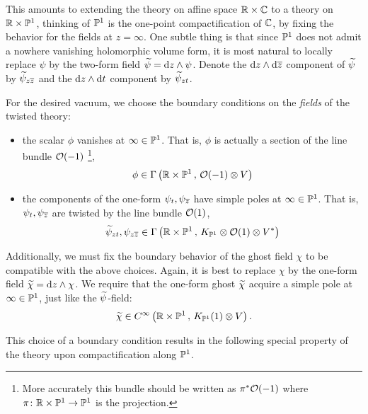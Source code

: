 \documentclass[11pt]{amsart}
\begin{document}
This amounts to extending the theory on affine space $\mathbb R \times \mathbb C$ to a theory on $\mathbb R \times \mathbb P^1$, thinking of $\mathbb P^1$ is the one-point compactification of $\mathbb C$, by fixing the behavior for the fields at $z = \infty$. 
One subtle thing is that since $\mathbb P^1$ does not admit a nowhere vanishing holomorphic volume form, it is most natural to locally replace $\psi$ by the two-form field $\widetilde \psi = {\rm d} z \wedge \psi$.
Denote the ${\rm d} z  \wedge {\rm d} {\overline{z}}$ component of $\widetilde \psi$ by $\widetilde \psi_{z {\overline{z}}}$ and the ${\rm d} z  \wedge {\rm d} t$ component by $\widetilde \psi_{zt}$. 

For the desired vacuum, we choose the boundary conditions on the \textit{fields} of the twisted theory:
\begin{itemize}
\item the scalar $\phi$ vanishes at $\infty \in \mathbb P^1$. 
That is, $\phi$ is actually a section of the line bundle $\mathcal O(-1)$ \footnote{More accurately this bundle should be written as $\pi^* \mathcal O(-1)$ where $\pi \colon \mathbb R \times \mathbb P^1 \to \mathbb P^1$ is the projection.}, 
\[
\phi \in \Gamma \left(\mathbb R \times \mathbb P^1 \, , \, \mathcal O(-1) \otimes V \right) 
\]
\item the components of the one-form $\psi_{t}, \psi_{{\overline{z}}}$ have simple poles at $\infty \in \mathbb P^1$.
That is, $\psi_t,\psi_{{\overline{z}}}$ are twisted by the line bundle $\mathcal O(1)$,
\[
\widetilde \psi_{zt}, \psi_{z{\overline{z}}}\in \Gamma\left(\mathbb R \times \mathbb P^1 \, , \, K_{\mathbb P^1} \otimes \mathcal O(1) \otimes V^*\right)
\]
\end{itemize}

Additionally, we must fix the boundary behavior of the ghost field $\chi$ to be compatible with the above choices.
Again, it is best to replace $\chi$ by the one-form field $\widetilde \chi = {\rm d} z \wedge \chi$. 
We require that the one-form ghost $\widetilde \chi$ acquire a simple pole at $\infty \in \mathbb P^1$, just like the $\widetilde \psi$-field:
\[
\widetilde\chi \in C^\infty\left(\mathbb R \times \mathbb P^1 \, , \, K_{\mathbb P^1}(1) \otimes V\right) .
\]

This choice of a boundary condition results in the following special property of the theory upon compactification along $\mathbb P^1$.
\end{document}
